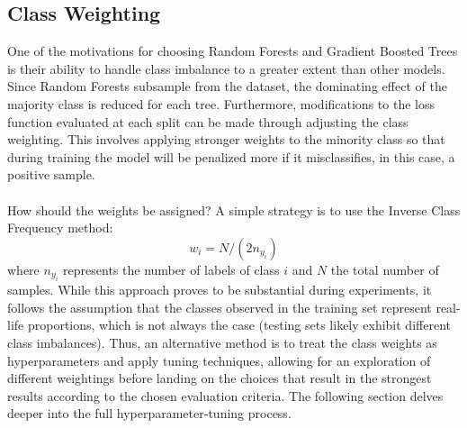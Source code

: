 \documentclass[a4paper]{report}
\begin{document}
\subsection{Class Weighting}
One of the motivations for choosing Random Forests and Gradient Boosted Trees is their ability to handle class imbalance to a greater extent than other models. Since Random Forests subsample from the dataset, the dominating effect 
of the majority class is reduced for each tree. Furthermore, modifications to the loss function evaluated at each split can be made through adjusting the class weighting. This involves applying stronger weights to 
the minority class so that during training the model will be penalized more if it misclassifies, in this case, a positive sample.\\\\How should the weights be assigned? A simple strategy 
is to use the Inverse Class Frequency method:
\begin{equation}
  w_i = N / (2n_{y_i})
\end{equation}
where \(n_{y_i}\) represents the number of labels of class \(i\) and \(N\) the total number of samples. While this approach proves to be substantial during experiments, it follows the assumption that the classes observed 
in the training set represent real-life proportions, which is not always the case (testing sets likely exhibit different class imbalances). Thus, an alternative 
method is to treat the class weights as hyperparameters and apply tuning techniques, allowing for an exploration of different weightings before landing 
on the choices that result in the strongest results according to the chosen evaluation criteria. The following section delves deeper into the full hyperparameter-tuning process.
\end{document}
